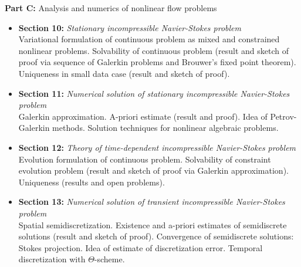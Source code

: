 \documentclass[a4paper,10pt]{article}
\begin{document}
\textbf{Part C:} Analysis and numerics of nonlinear flow problems
\begin{itemize}
\item \textbf{Section 10:} \textit{Stationary incompressible Navier-Stokes problem}\\
Variational formulation of continuous problem as mixed and constrained nonlinear problems.
Solvability of continuous problem (result and sketch of proof via sequence of Galerkin problems
and Brouwer’s fixed point theorem). Uniqueness in small data case (result and sketch of proof).
\item \textbf{Section 11:} \textit{Numerical solution of stationary incompressible Navier-Stokes problem}\\
Galerkin approximation. A-priori estimate (result and proof). Idea of Petrov-Galerkin methods.
Solution techniques for nonlinear algebraic problems.
\item \textbf{Section 12:} \textit{Theory of time-dependent incompressible Navier-Stokes problem}\\
Evolution formulation of continuous problem. Solvability of constraint evolution problem (result
and sketch of proof via Galerkin approximation). Uniqueness (results and open problems).
\item \textbf{Section 13:} \textit{Numerical solution of transient incompressible Navier-Stokes problem}\\
Spatial semidiscretization. Existence and a-priori estimates of semidiscrete solutions (result and
sketch of proof). Convergence of semidiscrete solutions: Stokes projection. Idea of estimate of
discretization error. Temporal discretization with $\Theta$-scheme.
\end{itemize}
\end{document}
